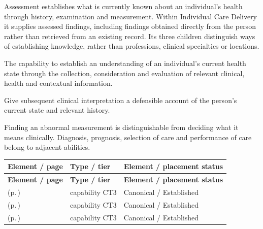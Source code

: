 Assessment establishes what is currently known about an individual's health through history, examination and measurement. Within Individual Care Delivery it supplies assessed findings, including findings obtained directly from the person rather than retrieved from an existing record. Its three children distinguish ways of establishing knowledge, rather than professions, clinical specialties or locations.



The capability to establish an understanding of an individual's current health state through the collection, consideration and evaluation of relevant clinical, health and contextual information.



Give subsequent clinical interpretation a defensible account of the person's current state and relevant history.



Finding an abnormal measurement is distinguishable from deciding what it means clinically. Diagnosis, prognosis, selection of care and performance of care belong to adjacent abilities.


\begingroup\small\setlength{\TableWidth}{\dimexpr\linewidth-6\tabcolsep-4\arrayrulewidth\relax}
\begin{longtable}{|>{\raggedright\arraybackslash}p{0.52\TableWidth}|>{\raggedright\arraybackslash}p{0.2\TableWidth}|>{\raggedright\arraybackslash}p{0.28\TableWidth}|}
\hline\rowcolor{TableHead}\textbf{Element / page} & \textbf{Type / tier} & \textbf{Element / placement status}\\\hline\endfirsthead
\hline\rowcolor{TableHead}\textbf{Element / page} & \textbf{Type / tier} & \textbf{Element / placement status}\\\hline\endhead
\hline\endfoot
\nameref{cap:bc-health-history-assessment} (p.\,\pageref{cap:bc-health-history-assessment}) & capability CT3 & Canonical / Established\\\hline
\nameref{cap:bc-clinical-examination} (p.\,\pageref{cap:bc-clinical-examination}) & capability CT3 & Canonical / Established\\\hline
\nameref{cap:bc-health-status-measurement} (p.\,\pageref{cap:bc-health-status-measurement}) & capability CT3 & Canonical / Established\\\hline
\end{longtable}\endgroup

